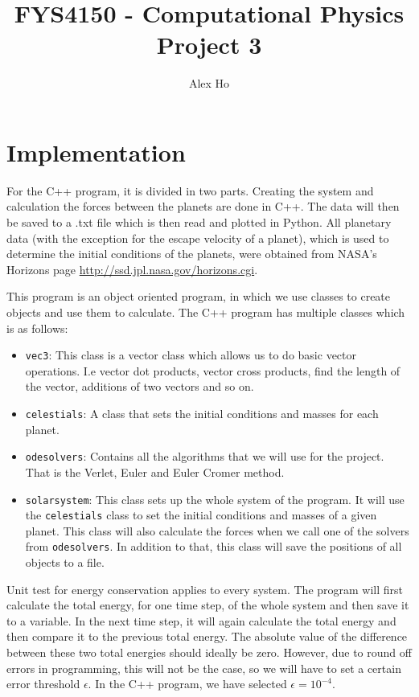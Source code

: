 \documentclass[12pt]{article}
\author{Alex Ho}
\title{FYS4150 - Computational Physics \\ Project 3}
\begin{document}
\maketitle
\section*{Implementation}
For the C++ program, it is divided in two parts. Creating the system and calculation the forces between the planets are done in C++. The data will then be saved to a .txt file which is then read and plotted in Python. All planetary data (with the exception for the escape velocity of a planet), which is used to determine the initial conditions of the planets, were obtained from NASA's Horizons page \url{http://ssd.jpl.nasa.gov/horizons.cgi}. 

This program is an object oriented program, in which we use classes to create objects and use them to calculate. The C++ program has multiple classes which is as follows:
\begin{itemize}
\item \texttt{vec3}: This class is a vector class which allows us to do basic vector operations. I.e vector dot products, vector cross products, find the length of the vector, additions of two vectors and so on.
\item \texttt{celestials}: A class that sets the initial conditions and masses for each planet. 
\item \texttt{odesolvers}: Contains all the algorithms that we will use for the project. That is the Verlet, Euler and Euler Cromer method.
\item \texttt{solarsystem}: This class sets up the whole system of the program. It will use the \texttt{celestials} class to set the initial conditions and masses of a given planet. This class will also calculate the forces when we call one of the solvers from \texttt{odesolvers}. In addition to that, this class will save the positions of all objects to a file.
\end{itemize}

Unit test for energy conservation applies to every system. The program will first calculate the total energy, for one time step, of the whole system and then save it to a variable. In the next time step, it will again calculate the total energy and then compare it to the previous total energy. The absolute value of the difference between these two total energies should ideally be zero. However, due to round off errors in programming, this will not be the case, so we will have to set a certain error threshold $\epsilon$. In the C++ program, we have selected $\epsilon = 10^{-4}$.
\end{document}
